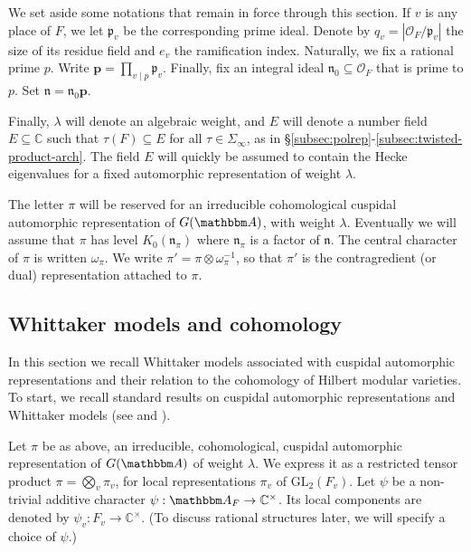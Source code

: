 \documentclass[10pt, twoside]{amsart}
\theoremstyle{plain}
\theoremstyle{definition}
\theoremstyle{remark}
\numberwithin{equation}{subsection}
\def\C{\mathbb C}
\def\A{\mathbbm A}
\def\p{\mathbf{p}}
\def\GL{\mathrm{GL}}
\def\gp{\mathfrak p}
\def\gn{\mathfrak n}
\def\scro{\mathscr O}
\def\scro{\mathscr O}
\begin{document}
We set aside some notations that remain in force through this section. If $v$ is any place of $F$, we let $\gp_v$ be the corresponding prime ideal. Denote by $q_v = |\scro_F/\gp_v|$ the size of its residue field and $e_v$ the ramification index. Naturally, we fix a rational prime $p$. Write $\p = \prod_{v \mid p} \gp_v$. Finally, fix an integral ideal $\gn_0 \subseteq \scro_F$ that is prime to $p$. Set $\gn = \gn_0\p$.

Finally, $\lambda$ will denote an algebraic weight, and $E$ will denote a number field $E \subseteq \C$ such that $\tau(F) \subseteq E$ for all $\tau \in \Sigma_\infty$, as in \S \ref{subsec:polrep}-\ref{subsec:twisted-product-arch}. The field $E$ will quickly be assumed to contain the Hecke eigenvalues for a fixed automorphic representation of weight $\lambda$.

The letter $\pi$ will be reserved for an irreducible cohomological cuspidal automorphic representation of $G(\A)$, with weight $\lambda$. Eventually we will assume that $\pi$ has level $K_0(\gn_{\pi})$ where $\gn_{\pi}$ is a factor of $\gn$. The central character of $\pi$ is written $\omega_{\pi}$. We write $\pi' = \pi \otimes \omega_{\pi}^{-1}$, so that $\pi'$ is the contragredient (or dual) representation attached to $\pi$.


\subsection{Whittaker models and cohomology}\label{sec:whittaker-coh-periods}
In this section we recall Whittaker models associated with cuspidal automorphic representations and their relation to the cohomology of Hilbert modular varieties. To start, we recall standard results on cuspidal automorphic representations and Whittaker models (see \cite[Chapers 3-4]{Bump} and \cite{RaTa}). 

Let $\pi$ be as above, an irreducible, cohomological, cuspidal automorphic representation of $G(\A)$ of weight $\lambda$. We express it as a restricted tensor product $\pi = \bigotimes_v \pi_v$, for local representations $\pi_v$ of $\GL_2(F_v)$. Let $\psi$ be a non-trivial additive character $\psi: \A_F \to \C^\times$. Its local components are denoted by $\psi_v : F_v \to \C^\times$. (To discuss rational structures later, we will specify a choice of $\psi$.)
\end{document}
